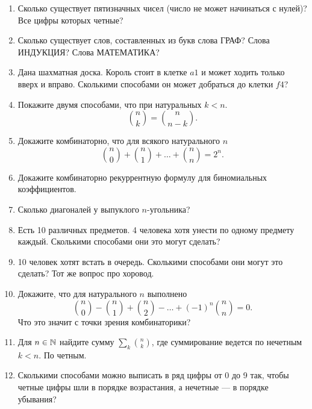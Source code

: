 \begin{enumerate}
    \item Сколько существует пятизначных чисел (число не может
        начинаться с нулей)? Все цифры которых четные?

    \item Сколько существует слов, составленных из букв слова
        ГРАФ? Слова ИНДУКЦИЯ? Слова МАТЕМАТИКА?

    \item Дана шахматная доска. Король стоит в клетке $a1$ и может
        ходить только вверх и вправо. Сколькими способами он может
        добраться до клетки $f4$?

    \item Покажите двумя способами, что при натуральных $k < n$.
        \[
            \binom{n}{k} = \binom{n}{n-k}.
            \]

    \item Докажите комбинаторно, что для всякого натурального $n$
        \[
            \binom{n}{0} + \binom{n}{1} + \ldots + \binom{n}{n} = 2^n.
            \]

    \item Докажите комбинаторно рекуррентную формулу для 
        биномиальных коэффициентов.
    
    \item Сколько диагоналей у выпуклого $n$-угольника?

    \item Есть 10 различных предметов. 4 человека хотя унести по
        одному предмету каждый. Сколькими способами они это могут
        сделать?

    \item 10 человек хотят встать в очередь. Сколькими способами они
        могут это сделать? Тот же вопрос про хоровод.

    \item Докажите, что для натурального $n$ выполнено
        \[
            \binom{n}{0} - \binom{n}{1} + \binom{n}{2} - \ldots 
            + (-1)^n \binom{n}{n} = 0.
            \]
        Что это значит с точки зрения комбинаторики?

    \item Для $n \in \mathbb{N}$ найдите сумму $\sum_k \binom{n}{k}$, где
        суммирование ведется по нечетным $k < n$. По четным.

    \item Сколькими способами можно выписать в ряд цифры от 0 до 9
        так, чтобы четные цифры шли в порядке возрастания, а
        нечетные --- в порядке убывания?


\end{enumerate}

